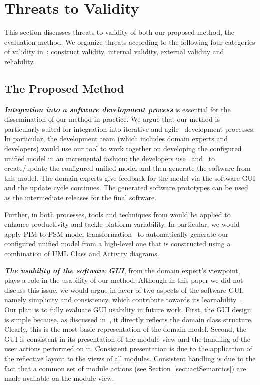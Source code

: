 \section{Threats to Validity} \label{sect:threats}
This section discusses threats to validity of both our proposed method, the evaluation method. We organize threats according to the following four categories of validity in~\cite{runeson2009guidelines}: construct validity, internal validity, external validity and reliability.

\subsection{The Proposed Method}

\textbf{\textit{Integration into a software development process}} is essential for the dissemination of our method in practice. We argue that our method is particularly suited for integration into iterative \cite{larman_applying_2004} and agile~\cite{beck_manifesto_2017} development processes. In particular, the development team (which includes domain experts and developers) would use our tool to work together on developing the configured unified model in an incremental fashion: the developers use \dcsl~and \agl~to create/update the configured unified model and then generate the software from this model. The domain experts give feedback for the model via the software GUI and the update cycle continues. The generated software prototypes can be used as the intermediate releases for the final software.

Further, in both processes, tools and techniques from  would be applied to enhance productivity and tackle platform variability. In particular, we would apply PIM-to-PSM model transformation~\cite{kent_model_2002,brambilla_model-driven_2012} to automatically generate our configured unified model from a high-level one that is constructed using a combination of UML Class and Activity diagrams.

\textbf{\textit{The usability of the software GUI}}, from the domain expert's viewpoint, plays a role in the usability of our method. Although in this paper we did not discuss this issue, we would argue in favor of two aspects of the software GUI, namely simplicity and consistency, which contribute towards its learnability~\cite{folmer_architecting_2004}. Our plan is to fully evaluate GUI usability in future work. First, the GUI design is simple because, as discussed in~\cite{le_domain_2018}, it directly reflects the domain class structure. Clearly, this is the most basic representation of the domain model. Second, the GUI is consistent in its presentation of the module view and the handling of the user actions performed on it. Consistent presentation is due to the application of the reflective layout to the views of all modules. Consistent handling is due to the fact that a common set of module actions (see Section~\ref{sect:actSemantics}) are made available on the module view.

